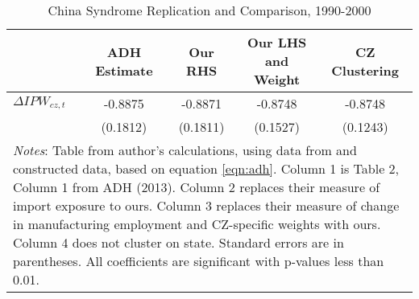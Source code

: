 
\begin{table}\centering
\caption{China Syndrome Replication and Comparison, 1990-2000 \label{tab:adhreplication}}
\begin{tabular}{lcccc}
\hline\hline
       & ADH Estimate & Our RHS & Our LHS and Weight & CZ Clustering  \\
       \hline
$\Delta IPW_{cz,t}$ & -0.8875 & -0.8871 & -0.8748 & -0.8748 \\
                   & (0.1812) & (0.1811) & (0.1527) & (0.1243) \\

\hline
\multicolumn{5}{p{6in}}{\footnotesize \textit{Notes}: Table from author's calculations, using data from \citet{ADH2013} and constructed data, based on equation \ref{eqn:adh}. Column 1 is Table 2, Column 1 from ADH (2013). Column 2 replaces their measure of import exposure to ours. Column 3 replaces their measure of change in manufacturing employment and CZ-specific weights with ours. Column 4 does not cluster on state. Standard errors are in parentheses. All coefficients are significant with p-values less than 0.01.}\\
\end{tabular}
\end{table}

